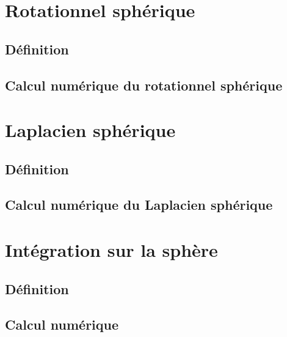 \section{Rotationnel sphérique}

\subsection{Définition}

\subsection{Calcul numérique du rotationnel sphérique}

\section{Laplacien sphérique}

\subsection{Définition}

\subsection{Calcul numérique du Laplacien sphérique}

\section{Intégration sur la sphère}

\subsection{Définition}

\subsection{Calcul numérique}